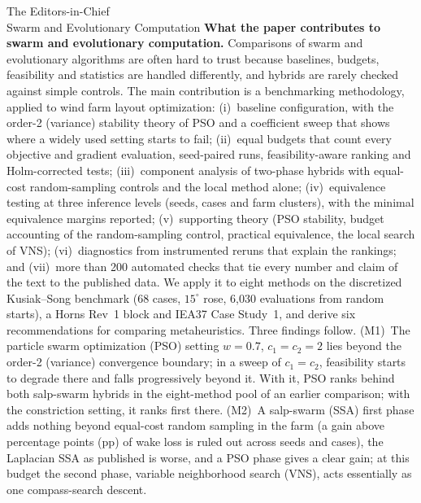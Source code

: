 \documentclass[11pt]{letter}
\newcommand{\Journal}{Swarm and Evolutionary Computation}
\newcommand{\JournalEditor}{The Editors-in-Chief}
\begin{document}
\begin{letter}{\JournalEditor\\\Journal}
\textbf{What the paper contributes to swarm and evolutionary computation.} Comparisons of swarm and evolutionary algorithms are often hard to trust because baselines, budgets, feasibility and statistics are handled differently, and hybrids are rarely checked against simple controls. The main contribution is a benchmarking methodology, applied to wind farm layout optimization: (i)~baseline configuration, with the order-2 (variance) stability theory of PSO and a coefficient sweep that shows where a widely used setting starts to fail; (ii)~equal budgets that count every objective and gradient evaluation, seed-paired runs, feasibility-aware ranking and Holm-corrected tests; (iii)~component analysis of two-phase hybrids with equal-cost random-sampling controls and the local method alone; (iv)~equivalence testing at three inference levels (seeds, cases and farm clusters), with the minimal equivalence margins reported; (v)~supporting theory (PSO stability, budget accounting of the random-sampling control, practical equivalence, the local search of VNS); (vi)~diagnostics from instrumented reruns that explain the rankings; and (vii)~more than 200 automated checks that tie every number and claim of the text to the published data. We apply it to eight methods on the discretized Kusiak--Song benchmark (68 cases, $15^\circ$ rose, 6,030 evaluations from random starts), a Horns Rev~1 block and IEA37 Case Study~1, and derive six recommendations for comparing metaheuristics. Three findings follow.
(M1)~The particle swarm optimization (PSO) setting $w=0.7$, $c_1=c_2=2$ lies beyond the order-2 (variance) convergence boundary; in a sweep of $c_1=c_2$, feasibility starts to degrade there and falls progressively beyond it. With it, PSO ranks behind both salp-swarm hybrids in the eight-method pool of an earlier comparison; with the constriction setting, it ranks first there.
(M2)~A salp-swarm (SSA) first phase adds nothing beyond equal-cost random sampling in the farm (a gain above \NEqMargin{} percentage points (pp) of wake loss is ruled out across seeds and cases), the Laplacian SSA as published is worse, and a PSO phase gives a clear gain; at this budget the second phase, variable neighborhood search (VNS), acts essentially as one compass-search descent.

\end{letter}
\end{document}
